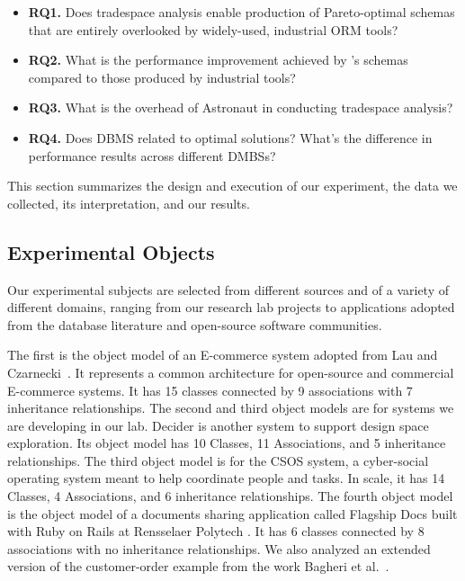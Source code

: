 \documentclass[10pt,conference]{IEEEtran}
\begin{document}
\begin{itemize}
\item \textbf{RQ1.} Does \@approach tradespace analysis enable production of Pareto-optimal schemas that are entirely overlooked by widely-used, industrial ORM tools? 
\item \textbf{RQ2.} What is the performance improvement achieved by \@approach's schemas compared to those produced by industrial tools? 
\item \textbf{RQ3.} What is the overhead of Astronaut in conducting tradespace analysis?
\item \textbf{RQ4.} Does DBMS related to optimal solutions? What’s the difference in performance results across different DMBSs?
\end{itemize}

This section summarizes the design and execution of our experiment, the data we collected, its interpretation, and our results.


\subsection{Experimental Objects}

Our experimental subjects are selected from different sources and of a variety of different domains, ranging from our research lab projects to applications adopted from the database literature and open-source software communities. 

The first is the object model of an E-commerce system adopted from Lau and Czarnecki~\cite{sean_quan_lau_domain_2006}. It represents a common architecture for open-source and commercial E-commerce systems. It has 15 classes connected by 9 associations with 7 inheritance relationships. The second and third object models are for systems we are developing in our lab. Decider is another system to support design space exploration. Its object model has 10 Classes, 11 Associations, and 5 inheritance relationships. The third object model is for the CSOS system, a  cyber-social operating system meant to help coordinate people and tasks. In scale, it has 14 Classes, 4 Associations, and 6 inheritance relationships. The fourth object model is the object model of a documents sharing application called Flagship Docs built with Ruby on Rails at Rensselaer Polytech \cite{FlagshipDocs4}. It has 6 classes connected by 8 associations with no inheritance relationships. We also analyzed an extended version of the customer-order example from the work Bagheri et al.~\cite{trademaker}.
 
\end{document}
